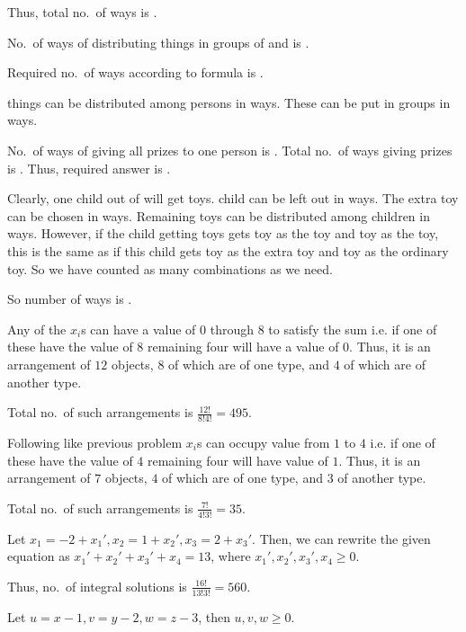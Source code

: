   Thus, total no.\ of ways is .
\item No.\ of ways of distributing  things in groups of  and  is .
\item Required no.\ of ways according to formula is .
\item {} things can be distributed among  persons in  ways. These can be
  put in  groups in  ways.
\item No.\ of ways of giving all prizes to one person is . Total no.\ of ways giving prizes is
  . Thus, required answer is .
\item Clearly, one child out of  will get  toys.  child can be left out in 
  ways. The extra toy can be chosen in  ways. Remaining  toys can be distributed among  children in  ways. However, if the child getting  toys gets toy  as the
   toy and toy  as the  toy, this is the same as if this child gets toy
   as the extra toy and toy  as the ordinary toy. So we have counted  as many combinations
  as we need.

  So number of ways is .
\item Any of the $x_i$s can have a value of $0$ through $8$ to satisfy the sum i.e. if one of these have the
  value of $8$ remaining four will have a value of $0$. Thus, it is an arrangement
  of $12$ objects, $8$ of which are of one type, and $4$ of which are of another type.

  Total no.\ of such arrangements is $\frac{12!}{8!4!} = 495$.
\item Following like previous problem $x_i$s can occupy value from $1$ to $4$ i.e. if one of these have the
  value of $4$ remaining four will have value of $1$. Thus, it is an arrangement of $7$ objects, $4$ of
  which are of one type, and $3$ of another type.

  Total no.\ of such arrangements is $\frac{7!}{4!3!} = 35$.
\item Let $x_1 = -2 + x_1', x_2 = 1 + x_2', x_3 = 2 + x_3'$. Then, we can rewrite the given equation as
  $x_1' + x_2' + x_3' + x_4 = 13$, where $x_1', x_2', x_3', x_4\geq 0$.

  Thus, no.\ of integral solutions is $\frac{16!}{13!3!} = 560$.
\item Let $u = x - 1, v = y - 2, w = z - 3$, then $u, v, w \geq 0$.

